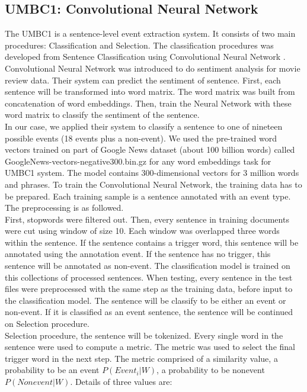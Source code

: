 \subsection{UMBC1: Convolutional Neural Network}
\label{umbc1}
The UMBC1 is a sentence-level event extraction system. It consists of two main procedures: Classification and Selection. The classification procedures was developed from Sentence Classification using Convolutional Neural Network \cite{kim2014convolutional}. Convolutional Neural Network was introduced to do sentiment analysis for movie review data. Their system can predict the sentiment of sentence. First, each sentence will be transformed into word matrix. The word matrix was built from concatenation of word embeddings. Then, train the Neural Network with these word matrix to classify the sentiment of the sentence. \\
\indent In our case, we applied their system to classify a sentence to one of nineteen possible events (18 events plus a non-event). We used the pre-trained word vectors trained on part of Google News dataset (about 100 billion words) called GoogleNews-vectors-negative300.bin.gz \cite{mikolov2013distributed} for any word embeddings task for UMBC1 system. The model contains 300-dimensional vectors for 3 million words and phrases. To train the Convolutional Neural Network, the training data has to be prepared. Each training sample is a sentence annotated with an event type. The preprocessing is as followed. \\
\indent First, stopwords were filtered out. Then, every sentence in training documents were cut using window of size 10. Each window was overlapped three words within the sentence. If the sentence contains a trigger word, this sentence will be annotated using the annotation event. If the sentence has no trigger, this sentence will be annotated as non-event. The classification model is trained on this collections of processed sentences. When testing, every sentence in the test files were preprocessed with the same step as the training data, before input to the classification model. The sentence will be classify to be either an event or non-event. If it is classified as an event sentence, the sentence will be continued on Selection procedure. \\
\indent Selection procedure, the sentence will be tokenized. Every single word in the sentence were used to compute a metric. The metric was used to select the final trigger word in the next step. The metric comprised of a similarity value, a probability to be an event $P(Event_i|W)$, a probability to be nonevent $P(Nonevent|W)$. Details of three values are: 
